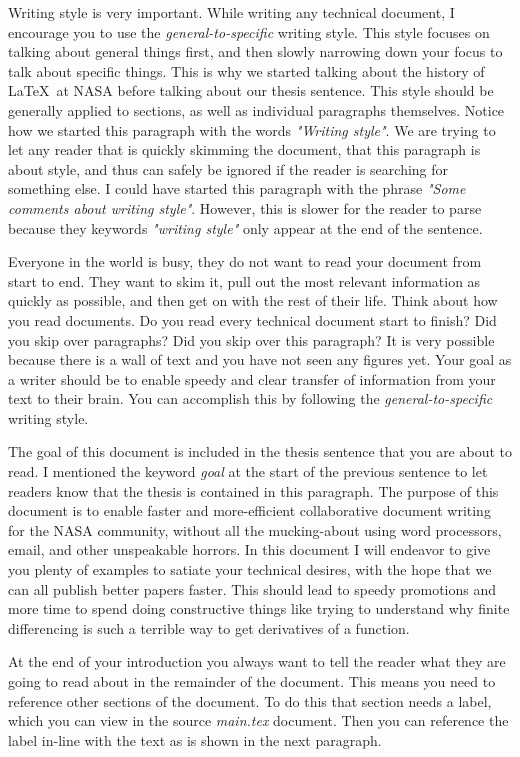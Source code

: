 \documentclass[]{NASA}
\begin{document}
\begin{flushleft}
Writing style is very important. While writing any technical document, I encourage you to use the \emph{general-to-specific} writing style. 
This style focuses on talking about general things first, and then slowly narrowing down your focus to talk about specific things. 
This is why we started talking about the history of \LaTeX ~at NASA before talking about our thesis sentence. 
This style should be generally applied to sections, as well as individual paragraphs themselves. 
Notice how we started this paragraph with the words \emph{"Writing style"}. We are trying to let any reader that is quickly skimming the document, that this paragraph is about style, and thus can safely be ignored if the reader is searching for something else. 
I could have started this paragraph with the phrase \emph{"Some comments about writing style"}. 
However, this is slower for the reader to parse because they keywords \emph{"writing style"} only appear at the end of the sentence. 

Everyone in the world is busy, they do not want to read your document from start to end. 
They want to skim it, pull out the most relevant information as quickly as possible, and then get on with the rest of their life. 
Think about how you read documents. 
Do you read every technical document start to finish? 
Did you skip over paragraphs? 
Did you skip over this paragraph? 
It is very possible because there is a wall of text and you have not seen any figures yet. 
Your goal as a writer should be to enable speedy and clear transfer of information from your text to their brain. 
You can accomplish this by following the \emph{general-to-specific} writing style.

The goal of this document is included in the thesis sentence that you are about to read. 
I mentioned the keyword \emph{goal} at the start of the previous sentence to let readers know that the thesis is contained in this paragraph. 
The purpose of this document is to enable faster and more-efficient collaborative document writing for the NASA community, without all the mucking-about using word processors, email, and other unspeakable horrors. 
In this document I will endeavor to give you plenty of examples to satiate your technical desires, with the hope that we can all publish better papers faster. 
This should lead to speedy promotions and more time to spend doing constructive things like trying to understand why finite differencing is such a terrible way to get derivatives of a function.

At the end of your introduction you always want to tell the reader what they are going to read about in the remainder of the document. 
This means you need to reference other sections of the document. 
To do this that section needs a label, which you can view in the source \emph{main.tex} document. 
Then you can reference the label in-line with the text as is shown in the next paragraph.


\end{flushleft}
\end{document}
